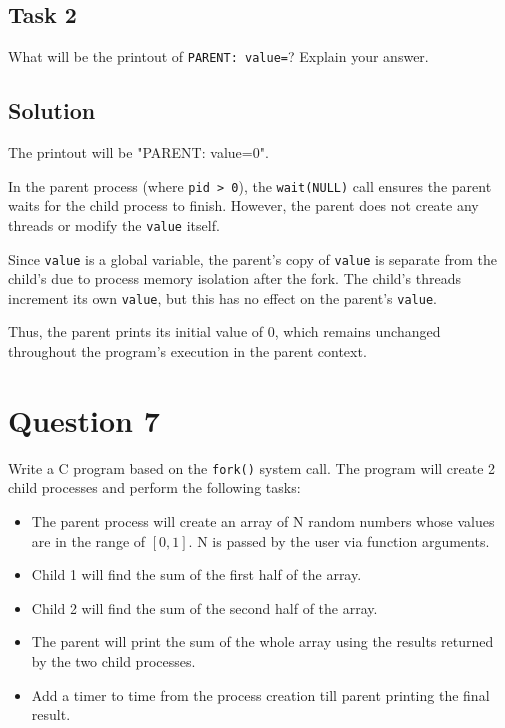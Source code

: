 \documentclass[../main.tex]{subfiles}
\begin{document}
\subsection{Task 2}

What will be the printout of \lstinline{PARENT: value=}? Explain your answer.

\subsection*{Solution}

The printout will be "PARENT: value=0".

In the parent process (where \lstinline{pid > 0}), the \lstinline{wait(NULL)} call ensures the parent waits for the child process to finish. However, the parent does not create any threads or modify the \lstinline{value} itself.

Since \lstinline{value} is a global variable, the parent's copy of \lstinline{value} is separate from the child's due to process memory isolation after the fork. The child's threads increment its own \lstinline{value}, but this has no effect on the parent's \lstinline{value}.

Thus, the parent prints its initial value of 0, which remains unchanged throughout the program's execution in the parent context.

\newpage
\section{Question 7}

Write a C program based on the \lstinline{fork()} system call. The program will create 2 child processes and perform the following tasks:

\begin{itemize}
    \item The parent process will create an array of N random numbers whose values are in the range of $[0, 1]$. N is passed by the user via function arguments.
    \item Child 1 will find the sum of the first half of the array.
    \item Child 2 will find the sum of the second half of the array.
    \item The parent will print the sum of the whole array using the results returned by the two child processes.
    \item Add a timer to time from the process creation till parent printing the final result.
\end{itemize}
\end{document}
